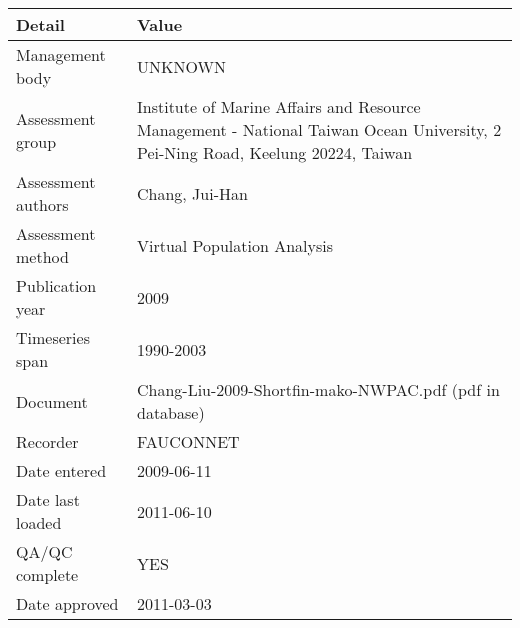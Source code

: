 \begin{table}[htb]
\centering
\begin{tabular}{lp{7cm}}
\toprule
Detail & Value \\
\midrule
Management body    & UNKNOWN                                                                                                                        \\
Assessment group   & Institute of Marine Affairs and Resource Management - National Taiwan Ocean University, 2 Pei-Ning Road, Keelung 20224, Taiwan \\
Assessment authors & Chang, Jui-Han                                                                                                                 \\
Assessment method  & Virtual Population Analysis                                                                                                    \\
Publication year   & 2009                                                                                                                           \\
Timeseries span    & 1990-2003                                                                                                                      \\
Document           & Chang-Liu-2009-Shortfin-mako-NWPAC.pdf (pdf in database)                                                                       \\
Recorder           & FAUCONNET                                                                                                                      \\
Date entered       & 2009-06-11                                                                                                                     \\
Date last loaded   & 2011-06-10                                                                                                                     \\
QA/QC complete     & YES                                                                                                                            \\
Date approved      & 2011-03-03                                                                                                                     \\
\bottomrule
\end{tabular}
\label{tab:assessdet}
\end{table}
